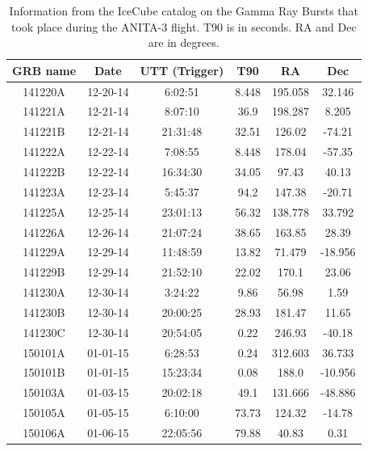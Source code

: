 \begin{table}
\centering
\begin{tabular}{ |c|c|c|c|c|c| } 
\hline
GRB name & Date & UTT (Trigger) & T90 & RA & Dec\\
\hline
141220A	& 12-20-14  & 6:02:51   & 8.448	& 195.058 & 32.146\\
141221A	& 12-21-14	& 8:07:10   & 36.9	& 198.287 & 8.205\\
141221B	& 12-21-14	& 21:31:48	& 32.51	& 126.02  &	-74.21\\
141222A	& 12-22-14	& 7:08:55	& 8.448	& 178.04  &	-57.35\\
141222B	& 12-22-14	& 16:34:30	& 34.05	& 97.43	  & 40.13\\
141223A	& 12-23-14	& 5:45:37	& 94.2	& 147.38  &	-20.71\\
141225A	& 12-25-14	& 23:01:13	& 56.32	& 138.778 &	33.792\\
141226A	& 12-26-14	& 21:07:24	& 38.65	& 163.85  &	28.39\\
141229A	& 12-29-14	& 11:48:59	& 13.82	& 71.479  &	-18.956\\
141229B	& 12-29-14	& 21:52:10	& 22.02	& 170.1	  & 23.06\\
141230A	& 12-30-14	& 3:24:22	& 9.86	& 56.98	  & 1.59\\
141230B	& 12-30-14	& 20:00:25	& 28.93	& 181.47  &	11.65\\
141230C	& 12-30-14	& 20:54:05	& 0.22	& 246.93  &	-40.18\\
150101A	& 01-01-15	& 6:28:53	& 0.24	& 312.603 &	36.733\\
150101B	& 01-01-15	& 15:23:34	& 0.08	& 188.0	  & -10.956\\
150103A	& 01-03-15	& 20:02:18	& 49.1	& 131.666 &	-48.886\\
150105A	& 01-05-15	& 6:10:00	& 73.73	& 124.32  &	-14.78\\
150106A	& 01-06-15	& 22:05:56	& 79.88	& 40.83	  & 0.31\\
\hline
\end{tabular}
\caption{Information from the IceCube catalog on the Gamma Ray Bursts that took place during the ANITA-3 flight. T90 is in seconds. RA and Dec are in degrees.}
\label{catalog}
\end{table}

